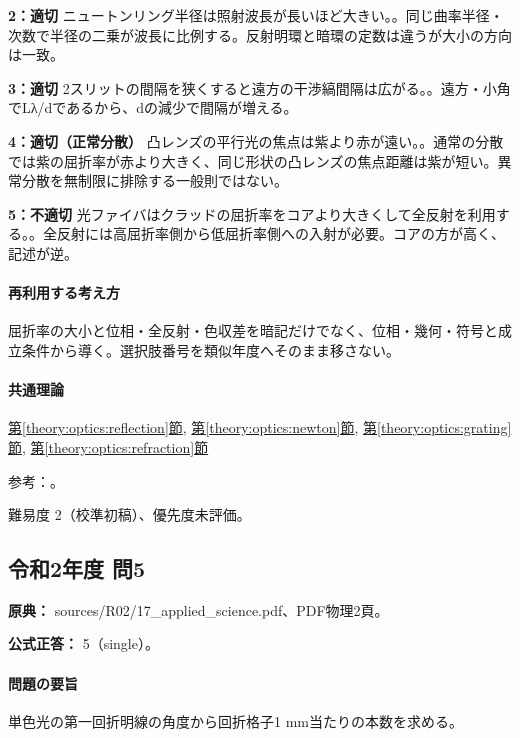 \noindent\textbf{2：適切} ニュートンリング半径は照射波長が長いほど大きい。。同じ曲率半径・次数で半径の二乗が波長に比例する。反射明環と暗環の定数は違うが大小の方向は一致。\par

\noindent\textbf{3：適切} 2スリットの間隔を狭くすると遠方の干渉縞間隔は広がる。。遠方・小角でLλ/dであるから、dの減少で間隔が増える。\par

\noindent\textbf{4：適切（正常分散）} 凸レンズの平行光の焦点は紫より赤が遠い。。通常の分散では紫の屈折率が赤より大きく、同じ形状の凸レンズの焦点距離は紫が短い。異常分散を無制限に排除する一般則ではない。\par

\noindent\textbf{5：不適切} 光ファイバはクラッドの屈折率をコアより大きくして全反射を利用する。。全反射には高屈折率側から低屈折率側への入射が必要。コアの方が高く、記述が逆。\par

\paragraph{再利用する考え方} 屈折率の大小と位相・全反射・色収差を暗記だけでなく、位相・幾何・符号と成立条件から導く。選択肢番号を類似年度へそのまま移さない。

\paragraph{共通理論} \hyperref[theory:optics:reflection]{第\ref*{theory:optics:reflection}節}, \hyperref[theory:optics:newton]{第\ref*{theory:optics:newton}節}, \hyperref[theory:optics:grating]{第\ref*{theory:optics:grating}節}, \hyperref[theory:optics:refraction]{第\ref*{theory:optics:refraction}節}

\par 参考：\cite{os_fiber,os_thinfilm,os_lens}。

\par 難易度 2（校準初稿）、優先度未評価。

\subsection{令和2年度 問5}
\label{q:r02-reg-applied-05}

\noindent\textbf{原典：} sources/R02/17\_applied\_science.pdf、PDF物理2頁。

\textbf{公式正答：} 5（single）。

\paragraph{問題の要旨} 単色光の第一回折明線の角度から回折格子1 mm当たりの本数を求める。

